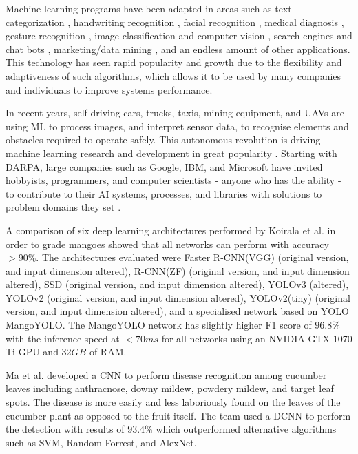 \documentclass[fleqn,twoside,12pt]{report}
\begin{document}
Machine learning programs have been adapted in areas such as text categorization \cite{sebastiani}, handwriting recognition \cite{bottou,bahlmann}, facial recognition \cite{bartlett,bartlett2,mohammed}, medical diagnosis \cite{shipp,ye,dreiseitl}, gesture recognition \cite{lustrek,rautaray}, image classification and computer vision \cite{chapelle,ciresan,krizhevsky}, search engines and chat bots \cite{boyan,graepel,jia}, marketing/data mining \cite{cui,bose}, and an endless amount of other applications. This technology has seen rapid popularity and growth due to the flexibility and adaptiveness of such algorithms, which allows it to be used by many companies and individuals to improve systems performance. 

In recent years, self-driving cars, trucks, taxis, mining equipment, and UAVs are using ML to process images, and interpret sensor data, to recognise elements and obstacles required to operate safely. This autonomous revolution is driving machine learning research and development in great popularity \cite{lecun}. Starting with DARPA, large companies such as Google, IBM, and Microsoft have invited hobbyists, programmers, and computer scientists - anyone who has the ability - to contribute to their AI systems, processes, and libraries with solutions to problem domains they set \cite{tensorflow,cortana,udacity,xprize}.


A comparison of six deep learning architectures performed by Koirala et al.\cite{koirala} in order to grade mangoes showed that all networks can perform with accuracy $>90\%$. The architectures evaluated were Faster R-CNN(VGG) (original version, and input dimension altered), R-CNN(ZF) (original version, and input dimension altered), SSD (original version, and input dimension altered), YOLOv3 (altered), YOLOv2 (original version, and input dimension altered), YOLOv2(tiny) (original version, and input dimension altered), and a specialised network based on YOLO MangoYOLO. The MangoYOLO network has slightly higher F1 score of $96.8\%$ with the inference speed at $<70ms$ for all networks using an NVIDIA GTX 1070 Ti GPU and $32GB$ of RAM.

Ma et al.\cite{ma} developed a CNN to perform disease recognition among cucumber leaves including anthracnose, downy mildew, powdery mildew, and target leaf spots. The disease is more easily and less laboriously found on the leaves of the cucumber plant as opposed to the fruit itself. The team used a DCNN to perform the detection with results of $93.4\%$ which outperformed alternative algorithms such as SVM, Random Forrest, and AlexNet.
\end{document}
